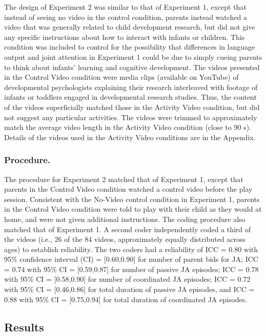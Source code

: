 \documentclass[man,floatsintext]{apa6}
\begin{document}
The design of Experiment 2 was similar to that of Experiment 1, except that instead of seeing no video in the control condition, parents instead watched a video that was generally related to child development research, but did not give any specific instructions about how to interact with infants or children.
This condition was included to control for the possibility that differences in language output and joint attention in Experiment 1 could be due to simply cueing parents to think about infants' learning and cognitive development.
The videos presented in the Control Video condition were media clips (available on YouTube) of developmental psychologists explaining their research interleaved with footage of infants or toddlers engaged in developmental research studies.
Thus, the content of the videos superficially matched those in the Activity Video condition, but did not suggest any particular activities.
The videos were trimmed to approximately match the average video length in the Activity Video condition (close to 90 s).
Details of the videos used in the Activity Video conditions are in the Appendix.

\hypertarget{procedure.-1}{%
\subsubsection{Procedure.}\label{procedure.-1}}

The procedure for Experiment 2 matched that of Experiment 1, except that parents in the Control Video condition watched a control video before the play session.
Consistent with the No-Video control condition in Experiment 1, parents in the Control Video condition were told to play with their child as they would at home, and were not given additional instructions.
The coding procedure also matched that of Experiment 1.
A second coder independently coded a third of the videos (i.e., 26 of the 84 videos, approximately equally distributed across ages) to establish reliability.
The two coders had a reliability of ICC = 0.80 with 95\% confidence interval (CI) = {[}0.60,0.90{]} for number of parent bids for JA; ICC = 0.74 with 95\% CI = {[}0.59,0.87{]} for number of passive JA episodes; ICC = 0.78 with 95\% CI = {[}0.58,0.90{]} for number of coordinated JA episodes; ICC = 0.72 with 95\% CI = {[}0.46,0.86{]} for total duration of passive JA episodes, and ICC = 0.88 with 95\% CI = {[}0.75,0.94{]} for total duration of coordinated JA episodes.

\hypertarget{results-1}{%
\subsection{Results}\label{results-1}}
\end{document}
